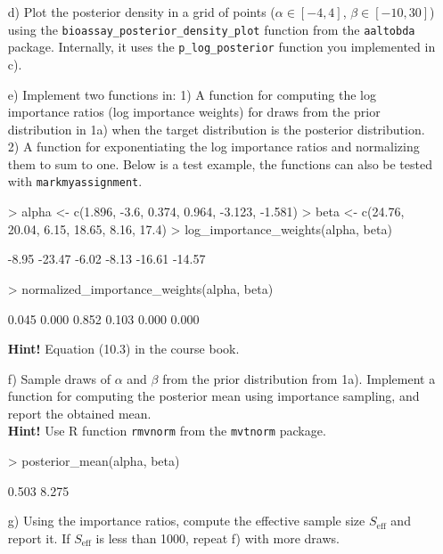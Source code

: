 \documentclass[11pt,a4paper,english]{article}
\begin{document}
\begin{enumerate}
\begin{itemize}
\item[d)] Plot the posterior density in a grid of points ($\alpha \in [-4,4]$, $\beta \in [-10,30]$) using the {\tt bioassay\_posterior\_density\_plot} function from the {\tt aaltobda} package. Internally, it uses the {\tt p\_log\_posterior} function you implemented in c).
\item[e)] Implement two functions in: 1) A function for computing the log importance ratios (log importance weights) for draws from the prior distribution in 1a) when the target distribution is the posterior distribution. 2) A function for exponentiating the log importance ratios and normalizing them to sum to one. Below is a test example, the functions can also be tested with \texttt{markmyassignment}.\\
\begin{Schunk}
\begin{Sinput}
> alpha <- c(1.896, -3.6,  0.374, 0.964, -3.123, -1.581)
> beta <- c(24.76, 20.04, 6.15, 18.65, 8.16, 17.4)
> log_importance_weights(alpha, beta)
\end{Sinput}
\begin{Soutput}
[1]  -8.95 -23.47  -6.02  -8.13 -16.61 -14.57
\end{Soutput}
\begin{Sinput}
> normalized_importance_weights(alpha, beta)
\end{Sinput}
\begin{Soutput}
[1] 0.045 0.000 0.852 0.103 0.000 0.000
\end{Soutput}
\end{Schunk}
\textbf{Hint!} Equation (10.3) in the course book.
\item[f)] Sample draws of $\alpha$ and $\beta$ from the prior distribution from 1a). Implement a function for computing the posterior mean using importance sampling, and report the obtained mean.\\
\textbf{Hint!} Use R function {\tt rmvnorm} from the {\tt mvtnorm} package.
\begin{Schunk}
\begin{Sinput}
> posterior_mean(alpha, beta)
\end{Sinput}
\begin{Soutput}
[1] 0.503 8.275
\end{Soutput}
\end{Schunk}
\item[g)] Using the importance ratios, compute the effective sample size $S_{\text{eff}}$ and report it. If $S_{\text{eff}}$ is less than 1000, repeat f) with more draws.\\

\end{itemize}
\end{enumerate}
\end{document}
